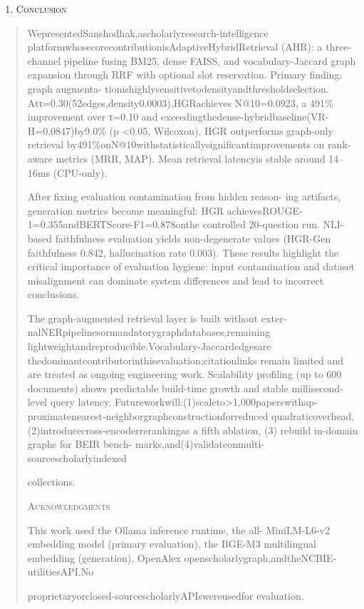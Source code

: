 \documentclass[
]{article}
\begin{document}
\begin{enumerate}
\def\labelenumi{\Roman{enumi}.}
\setcounter{enumi}{9}
\item
  \protect{}\label{Conclusion}{}\textsc{Conclusion}
\end{enumerate}

\begin{quote}
WepresentedSanshodhak,ascholarlyresearch-intelligence platformwhosecorecontributionisAdaptiveHybridRetrieval (AHR): a three-channel pipeline fusing BM25, dense FAISS, and vocabulary-Jaccard graph expansion through RRF with optional slot reservation. Primary finding: graph augmenta- tionishighlysensitivetodensityandthresholdselection. Atτ=0.30(52edges,density0.0003),HGRachieves N@10=0.0923, a 491\% improvement over τ=0.10 and exceedingthedense-hybridbaseline(VR-H=0.0847)by9.0\% (p \textless0.05, Wilcoxon). HGR outperforms graph-only retrieval by491\%onN@10withstatisticallysignificantimprovements on rank-aware metrics (MRR, MAP). Mean retrieval latencyis stable around 14--16ms (CPU-only).

After fixing evaluation contamination from hidden reason- ing artifacts, generation metrics become meaningful: HGR achievesROUGE-1=0.355andBERTScore-F1=0.878onthe controlled 20-question run. NLI-based faithfulness evaluation yields non-degenerate values (HGR-Gen faithfulness 0.842, hallucination rate 0.003). These results highlight the critical importance of evaluation hygiene: input contamination and dataset misalignment can dominate system differences and lead to incorrect conclusions.

The graph-augmented retrieval layer is built without exter- nalNERpipelinesormandatorygraphdatabases,remaining lightweightandreproducible.Vocabulary-Jaccardedgesare thedominantcontributorinthisevaluation;citationlinks remain limited and are treated as ongoing engineering work. Scalability profiling (up to 600 documents) shows predictable build-time growth and stable millisecond-level query latency. Futureworkwill:(1)scaleto\textgreater1,000paperswithap-proximatenearest-neighborgraphconstructionforreduced quadraticoverhead,(2)introducecross-encoderrerankingas a fifth ablation, (3) rebuild in-domain graphs for BEIR bench- marks,and(4)validateonmulti-sourcescholarlyindexed

collections.

\textsc{Acknowledgments}

This work used the Ollama inference runtime, the all- MiniLM-L6-v2 embedding model (primary evaluation), the BGE-M3 multilingual embedding (generation), OpenAlex openscholarlygraph,andtheNCBIE-utilitiesAPI.No

proprietaryorclosed-sourcescholarlyAPIswereusedfor evaluation.
\end{quote}
\end{document}

